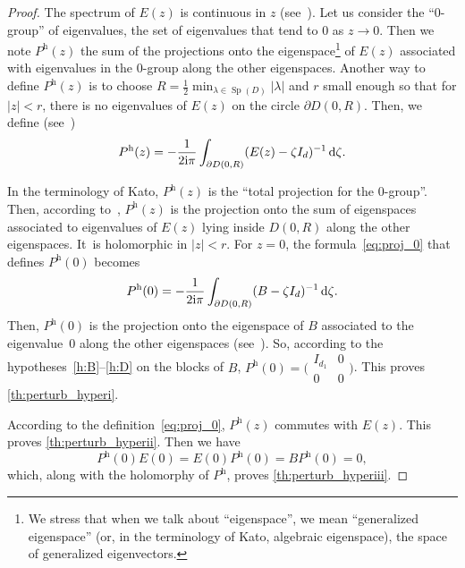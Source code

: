 \documentclass[10pt]{amsart}
\theoremstyle{plain}
\theoremstyle{definition}
\theoremstyle{remark}
\DeclareMathOperator{\Sp}{Sp}
\newcommand{\diff}[1][-3]{\ensuremath{\mathop{}\mkern#1mu\mathrm{d}}}
\newcommand{\h}{{\mathrm h}}
\newcommand{\iu}{\mathrm i}
\begin{document}
\begin{proof}
The spectrum of $E(z)$ is continuous in $z$ (see~\cite[Ch.\,II, \S1.2]{kato_1995}). Let us consider the ``$0$-group'' of eigenvalues, \ie the set of eigenvalues that tend to $0$ as $z\to 0$. Then we note $P^\h(z)$ the sum of the projections onto the eigenspace\footnote{We stress that when we talk about ``eigenspace'', we mean ``generalized eigenspace'' (or, in the terminology of Kato, algebraic eigenspace), \ie the space of generalized eigenvectors.} of $E(z)$ associated with eigenvalues in the $0$-group along the other eigenspaces. Another way to define $P^\h(z)$ is to choose $R=\frac12 \min_{\lambda\in\Sp(D)} |\lambda|$ and $r$ small enough so that for $|z|<r$, there is no eigenvalues of $E(z)$ on the circle $\partial D(0,R)$. Then, we define (see~\cite[Ch.\,II, Eq.\,(1.16)]{kato_1995})
\begin{equation}\label{eq:proj_0}
P^\h(z) = -\frac1{2\iu\pi}\int_{\partial D(0,R)} (E(z)-\zeta I_d)^{-1}\diff \zeta.
\end{equation}

In the terminology of Kato, $P^\h(z)$ is the ``total projection for the $0$-group''. Then, according to~\cite[Ch.\,II, \S1.4]{kato_1995}, $P^\h(z)$ is the projection onto the sum of eigenspaces associated to eigenvalues of $E(z)$ lying inside $D(0,R)$ along the other eigenspaces. It~is holomorphic in $|z|<r$. For $z=0$, the formula~\eqref{eq:proj_0} that defines $P^\h(0)$ becomes
\[
P^\h(0) = -\frac1{2\iu\pi}\int_{\partial D(0,R)} (B-\zeta I_d)^{-1}\diff \zeta.
\]
Then, $P^\h(0)$ is the projection onto the eigenspace of $B$ associated to the eigenvalue~$0$ along the other eigenspaces (see~\cite[Ch.\,II, \S1.4]{kato_1995}). So, according to the hypotheses~\eqref{h:B}--\eqref{h:D} on the blocks of $B$, $P^\h(0) = \big(\begin{smallmatrix}I_{d_1}&0\\0&0 \end{smallmatrix} \big)$. This proves \eqref{th:perturb_hyperi}.

According to the definition~\eqref{eq:proj_0}, $P^\h(z)$ commutes with $E(z)$. This proves \eqref{th:perturb_hyperii}. Then we have
\[
P^\h(0)E(0) = E(0)P^\h(0) = BP^\h(0) = 0,
\]
which, along with the holomorphy of $P^\h$, proves \eqref{th:perturb_hyperiii}.
\end{proof}
\end{document}

